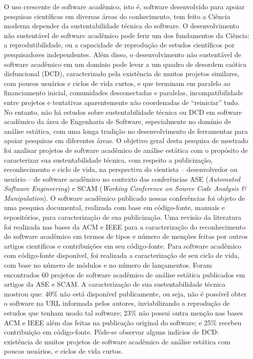 O uso crescente de software acadêmico, isto é, software desenvolvido para
apoiar pesquisas científicas em diversas áreas do conhecimento, tem feito
a Ciência moderna depender da sustentabilidade técnica do software.
%
O desenvolvimento não sustentável de software acadêmico pode ferir um dos
fundamentos da Ciência: a reprodutibilidade, ou a capacidade de reprodução de
estudos científicos por pesquisadores independentes.
%
Além disso, o desenvolvimento não sustentável de software acadêmico em um
domínio pode levar a um quadro de desordem caótica disfuncional (DCD),
caracterizado pela existência de muitos projetos similares, com poucos usuários
e ciclos de vida curtos, e que terminam em paralelo ao financiamento inicial,
comunidades desconectadas e paralelas, incompatibilidade entre projetos e
tentativas aparentemente não coordenadas de ``reiniciar'' tudo.
%
No entanto, não há
estudos sobre sustentabilidade técnica ou DCD em software acadêmico da
área de Engenharia de Software, especialmente no domínio de análise estática,
com uma longa tradição no desenvolvimento de ferramentas para apoiar pesquisas
em diferentes áreas.
%
O objetivo geral desta pesquisa de mestrado foi analisar projetos de
software acadêmico de análise estática 
com o propósito de caracterizar sua sustentabilidade técnica, 
com respeito a publicização, reconhecimento e ciclo de vida, 
na perspectiva do cientista -- desenvolvedor ou usuário -- de software
acadêmico no contexto das conferências 
ASE ({\it Automated Software Engineering}) e SCAM ({\it Working Conference on Source Code
Analysis \& Manipulation}).
%
O software acadêmico publicado nessas conferências 
foi objeto de uma pesquisa documental, realizada com base em código-fonte, 
manuais e repositórios, para caracterização de sua publicização.
%
Uma revisão da literatura foi realizada nas bases da ACM e IEEE
para a caracterização do reconhecimento do software acadêmico
em termos de tipos e número de menções feitas por outros artigos científicos e
contribuições em seu código-fonte.
%
Para software acadêmico com código-fonte disponível, 
foi realizada a caracterização de seu ciclo de vida,
com base no número de módulos e no número de lançamentos.
%
Foram encontrados 60 projetos de software acadêmico de análise estática
publicados em artigos da ASE e SCAM.
%
A caracterização de sua sustentabilidade técnica mostrou que: 
40\% não está disponível publicamente, ou seja, não é possível obter 
o software na URL informada pelos autores, inviabilizando 
a reprodução de estudos que tenham usado tal software;
%
23\% não possui outra menção nas bases ACM e IEEE além das feitas na publicação original
do software; e 25\% recebeu contribuição em código-fonte.
%
Pôde-se observar alguns indícios de DCD: 
existência de muitos projetos de software acadêmico de análise estática
com poucos usuários, e ciclos de vida curtos.
